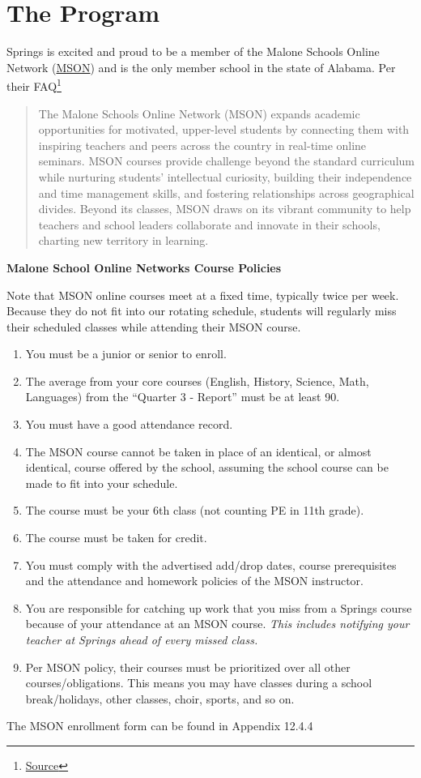 \section{The Program}
Springs is  excited and proud to be a member of the Malone Schools Online Network (\href{https://maloneschoolsonline.org/}{MSON}) and is the only member school in the state of Alabama.  Per their FAQ\footnote{\href{https://maloneschoolsonline.org/faq/}{Source}}

\begin{quote}
  The Malone Schools Online Network (MSON) expands academic opportunities for motivated, upper-level students by connecting them with inspiring teachers and peers across the country in real-time online seminars. MSON courses provide challenge beyond the standard curriculum while nurturing students’ intellectual curiosity, building their independence and time management skills, and fostering relationships across geographical divides. Beyond its classes, MSON draws on its vibrant community to help teachers and school leaders collaborate and innovate in their schools, charting new territory in learning.
\end{quote}

\noindent \textbf{Malone School Online Networks Course Policies}


Note that MSON online courses meet at a fixed time, typically twice per week.  Because they do not fit into our rotating schedule, students will regularly miss their scheduled classes while attending their MSON course. 

\begin{enumerate}\itemsep=0mm
\item You must be a junior or senior to enroll.
\item The average from your core courses (English, History, Science, Math, Languages) from the “Quarter 3 - Report” must be at least 90.
\item You must have a good attendance record. 
\item The MSON course cannot be taken in place of an identical, or almost identical, course offered by the school, assuming the school course can be made to fit into your schedule. 
\item The course must be your 6th class (not counting PE in 11th grade). 
\item The course must be taken for credit. 
\item You must comply with the advertised add/drop dates, course prerequisites and the attendance and homework policies of the MSON instructor. 
\item You are responsible for catching up work that you miss from a Springs course because of your attendance at an MSON course.  \emph{This includes notifying your teacher at Springs ahead of every missed class.}  
\item Per MSON policy, their courses must be prioritized over all other courses/obligations.  This means you may have classes during a school break/holidays, other classes, choir, sports, and so on.  
\end{enumerate}

The MSON enrollment form can be found in Appendix 12.4.4

